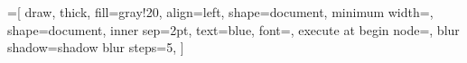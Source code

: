 \documentclass[14pt]{book}
\begin{document}
\fontsize{13pt}{17pt}\selectfont



\tableofcontents

\newpage
\listoffigures

=[%
draw,
thick,
fill=gray!20,
align=left,
shape=document,
minimum width=,
shape=document,
inner sep=2pt,
text=blue,
font=\large,
execute at begin node=\setlength{\baselineskip}{19pt},
blur shadow={shadow blur steps=5},
]






%
%
%
%
%
%
%
%
%
\end{document}
